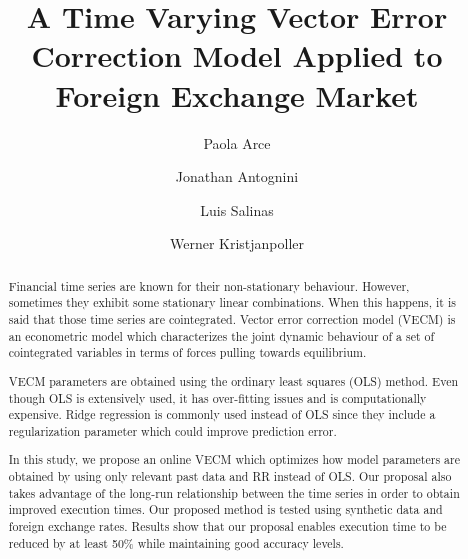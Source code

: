 \documentclass[12pt,reqno]{amsart}
\title{A Time Varying Vector Error Correction Model Applied to Foreign Exchange
Market}
\author{Paola Arce \and Jonathan Antognini \and Luis Salinas \and Werner Kristjanpoller}
\begin{document}
\maketitle

\begin{abstract}
Financial time series are known for their non-stationary behaviour. However,
sometimes they exhibit some stationary linear combinations. When this happens,
it is said that those time series are cointegrated. Vector error correction
model (VECM) is an econometric model which characterizes the joint dynamic
behaviour of a set of cointegrated variables in terms of forces pulling towards
equilibrium. 

VECM parameters are obtained using the ordinary least squares (OLS)
method.  Even though OLS is extensively used, it has over-fitting
issues and is computationally expensive. Ridge regression is commonly used
instead of OLS since they include a regularization parameter which could improve
prediction error.

In this study, we propose an online VECM which optimizes how model parameters
are obtained by using only relevant past data and RR instead of OLS.  Our
proposal also takes advantage of the long-run relationship between the time
series in order to obtain improved execution times. Our proposed method is
tested using synthetic data and foreign exchange rates.
Results show that our proposal enables execution time to be reduced by at least
50\% while maintaining good accuracy levels.
\end{abstract}









%
%
%
%
%
%
%
\end{document}
